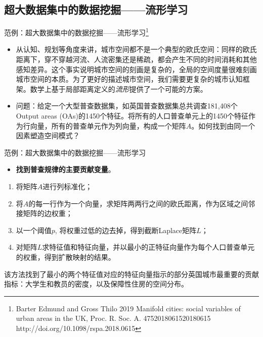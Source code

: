 \subsection{超大数据集中的数据挖掘——流形学习}
\begin{frame}{范例：超大数据集中的数据挖掘——流形学习\footnote{Barter Edmund and Gross Thilo 2019 Manifold cities: social variables of urban areas in the UK, Proc. R. Soc. A. 4752018061520180615 http://doi.org/10.1098/rspa.2018.0615}}

\begin{itemize}
    \item 从认知、规划等角度来讲，城市空间都不是一个典型的欧氏空间：同样的欧氏距离下，穿不穿越河流、人流密集还是稀疏，都会产生不同的时间消耗和其他感知差异。这个事实说明城市空间的刻画是复杂的，全局的空间度量很难刻画城市空间的本质。为了更好的描述城市空间，我们需要更复杂的城市认知框架。数学上基于局部距离定义的\textit{流形}提供了一个可能的方案。
    \pause
    \vspace{1cm}
    \item 问题：给定一个大型普查数据集，如英国普查数据集总共调查181,408个Output areas (OAs)的1450个特征。将所有的人口普查单元上的1450个特征作为行向量，所有的普查单元作为列向量，构成一个矩阵$A$。如何找到由同一个因素塑造空间模式？
\end{itemize}
\end{frame}

\begin{frame}{范例：超大数据集中的数据挖掘——流形学习}

    \begin{itemize}
        \item \textbf{找到普查规律的主要贡献变量}。
    \end{itemize}
    
    \vspace{0.5cm}
    \begin{enumerate}
    \item 将矩阵$A$进行列标准化；
    \item 将$A$的每一行作为一个向量，求矩阵两两行之间的欧氏距离，作为区域之间邻接矩阵的边权重；
    \item 以一个阈值$p$, 将权重过低的边去掉，得到截断Laplace矩阵$L$；
    \item 对矩阵$L$求特征值和特征向量，并以最小的正特征向量作为每个人口普查单元的权重，得到扩散映射的结果。
\end{enumerate}

\vspace{0.5cm}
该方法找到了最小的两个特征值对应的特征向量指示的部分英国城市最重要的贡献指标：大学生和教员的密度，以及保障性住房的空间分布。
\end{frame}

